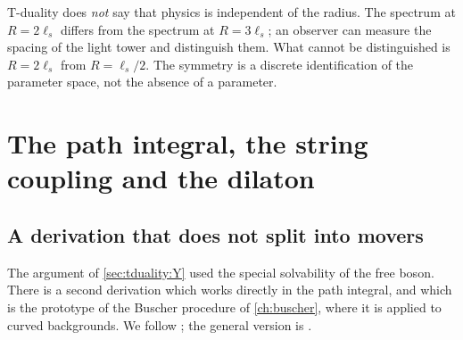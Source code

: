 \begin{pitfallbox}
T-duality does \emph{not} say that physics is independent of the radius. The spectrum at
$R=2\ell_s$ differs from the spectrum at $R=3\ell_s$; an observer can measure the spacing of the
light tower and distinguish them. What cannot be distinguished is $R=2\ell_s$ from
$R=\ell_s/2$. The symmetry is a discrete identification of the parameter space, not the
absence of a parameter.
\end{pitfallbox}

\section{The path integral, the string coupling and the dilaton}\label{sec:tduality:dilaton}

\subsection{A derivation that does not split into movers}

The argument of \cref{sec:tduality:Y} used the special solvability of the free boson. There is a
second derivation which works directly in the path integral, and which is the prototype of
the Buscher procedure of \cref{ch:buscher}, where it is applied to curved
backgrounds. We follow ; the general version is
.

